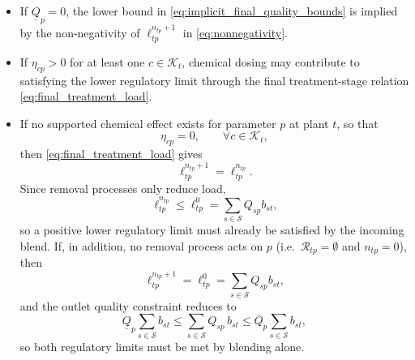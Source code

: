 \documentclass[10pt]{article}
\begin{document}
\begin{itemize}
    \item If $\underline{Q}_p = 0$, the lower bound in \eqref{eq:implicit_final_quality_bounds} is implied by the non-negativity of $\ell^{n_{tp}+1}_{tp}$ in \eqref{eq:nonnegativity}.

    \item If $\eta_{cp}>0$ for at least one $c\in\mathcal{K}_t$, chemical dosing may contribute to satisfying the lower regulatory limit through the final treatment-stage relation \eqref{eq:final_treatment_load}.

    \item If no supported chemical effect exists for parameter $p$ at plant $t$, so that
          \begin{equation*}
              \eta_{cp}=0,
              \qquad
              \forall c\in\mathcal{K}_t,
          \end{equation*}
          then \eqref{eq:final_treatment_load} gives
          \begin{equation*}
              \ell^{n_{tp}+1}_{tp}
              =
              \ell^{n_{tp}}_{tp}.
          \end{equation*}
          Since removal processes only reduce load,
          \begin{equation*}
              \ell^{n_{tp}}_{tp}
              \le
              \ell^0_{tp}
              =
              \sum_{s\in\mathcal{S}}Q_{sp}b_{st},
          \end{equation*}
          so a positive lower regulatory limit must already be satisfied by the incoming blend.
          If, in addition, no removal process acts on $p$ (i.e.\ $\mathcal{R}_{tp}=\emptyset$ and $n_{tp}=0$), then
          \begin{equation*}
              \ell^{n_{tp}+1}_{tp}
              =
              \ell^0_{tp}
              =
              \sum_{s\in\mathcal{S}}Q_{sp}b_{st},
          \end{equation*}
          and the outlet quality constraint reduces to
          \begin{equation*}
              \underline{Q}_p \sum_{s \in \mathcal{S}} b_{st}
              \le
              \sum_{s \in \mathcal{S}} Q_{sp}\,b_{st}
              \le
              \overline{Q}_p \sum_{s \in \mathcal{S}} b_{st},
          \end{equation*}
          so both regulatory limits must be met by blending alone.
\end{itemize}
\end{document}
